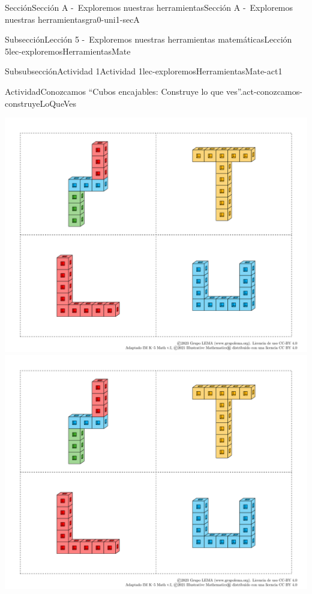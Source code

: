 \begin{sectionptx}{Sección}{Sección A -~Exploremos nuestras herramientas}{}{Sección A -~Exploremos nuestras herramientas}{}{}{gra0-uni1-secA}
\begin{subsectionptx}{Subsección}{Lección 5 -~Exploremos nuestras herramientas matemáticas}{}{Lección 5}{}{}{lec-exploremosHerramientasMate}
\begin{subsubsectionptx}{Subsubsección}{Actividad 1}{}{Actividad 1}{}{}{lec-exploremosHerramientasMate-act1}
\begin{activity}{Actividad}{Conozcamos “Cubos encajables: Construye lo que ves”.}{act-conozcamos-construyeLoQueVes}
\begin{cutoutpage}
\includegraphics[page=1, rotate=90, width=1.1\linewidth, center]{external/blm/tikz-source/cubos-encajables-tarjetas.pdf}
\cleardoublepage
\includegraphics[page=2, rotate=90, width=1.1\linewidth, center]{external/blm/tikz-source/cubos-encajables-tarjetas.pdf}
\cleardoublepage

\end{cutoutpage}
\end{activity}
\end{subsubsectionptx}
\end{subsectionptx}
\end{sectionptx}
